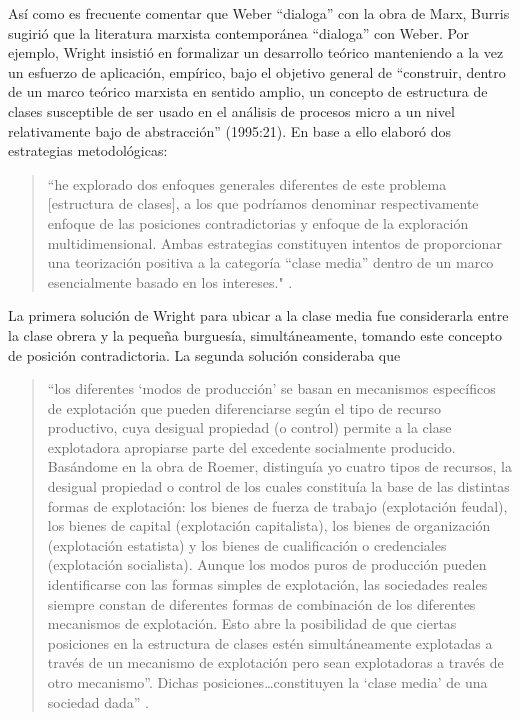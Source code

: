 \documentclass[
]{book}
\begin{document}
Así como es frecuente comentar que Weber ``dialoga'' con la obra de Marx, Burris \citeyearpar{Burris1995} sugirió que la literatura marxista contemporánea ``dialoga'' con Weber. Por ejemplo, Wright insistió en formalizar un desarrollo teórico manteniendo a la vez un esfuerzo de aplicación, empírico, bajo el objetivo general de ``construir, dentro de un marco teórico marxista en sentido amplio, un concepto de estructura de clases susceptible de ser usado en el análisis de procesos micro a un nivel relativamente bajo de abstracción'' (1995:21). En base a ello elaboró dos estrategias metodológicas:

\begin{quote}
``he explorado dos enfoques generales diferentes de este problema {[}estructura de clases{]}, a los que podríamos denominar respectivamente enfoque de las posiciones contradictorias y enfoque de la exploración multidimensional. Ambas estrategias constituyen intentos de proporcionar una teorización positiva a la categoría ``clase media'' dentro de un marco esencialmente basado en los intereses." \citep[p.~59]{Wright1995a}.
\end{quote}

La primera solución de Wright para ubicar a la clase media fue considerarla entre la clase obrera y la pequeña burguesía, simultáneamente, tomando este concepto de posición contradictoria. La segunda solución consideraba que

\begin{quote}
``los diferentes `modos de producción' se basan en mecanismos específicos de explotación que pueden diferenciarse según el tipo de recurso productivo, cuya desigual propiedad (o control) permite a la clase explotadora apropiarse parte del excedente socialmente producido. Basándome en la obra de Roemer, distinguía yo cuatro tipos de recursos, la desigual propiedad o control de los cuales constituía la base de las distintas formas de explotación: los bienes de fuerza de trabajo (explotación feudal), los bienes de capital (explotación capitalista), los bienes de organización (explotación estatista) y los bienes de cualificación o credenciales (explotación socialista). Aunque los modos puros de producción pueden identificarse con las formas simples de explotación, las sociedades reales siempre constan de diferentes formas de combinación de los diferentes mecanismos de explotación. Esto abre la posibilidad de que ciertas posiciones en la estructura de clases estén simultáneamente explotadas a través de un mecanismo de explotación pero sean explotadoras a través de otro mecanismo''. Dichas posiciones\ldots constituyen la `clase media' de una sociedad dada'' \citep[pp.~65-66]{Wright1995a}.
\end{quote}
\end{document}
